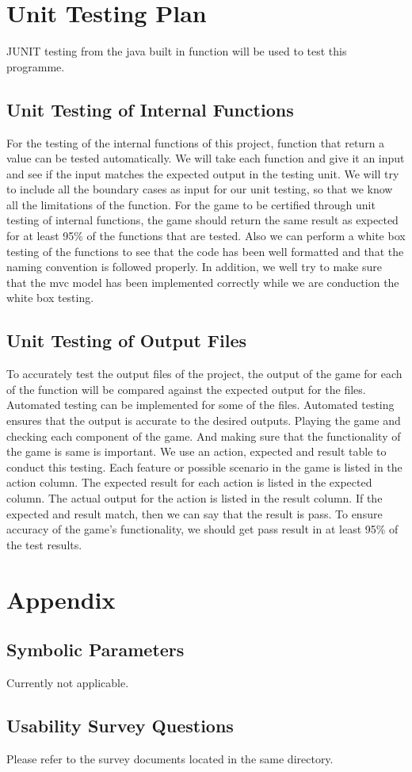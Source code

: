 \documentclass[12pt,letterpaper]{article}
\begin{document}
	\section{Unit Testing Plan}
	JUNIT testing from the java built in function will be used to test this programme.
	\subsection{Unit Testing of Internal Functions}
	 For the testing of the internal functions of this project, function that return a value can be tested automatically. We will take each function and give it an input and see if the input matches the expected output in the testing unit. We will try to include all the boundary cases as input for our unit testing, so that we know all the limitations of the function. For the game to be certified through unit testing of internal functions, the game should return the same result as expected for at least 95\% of the functions that are tested. Also we can perform a white box testing of the functions to see that the code has been well formatted and that the naming convention is followed properly. In addition, we well try to make sure that the mvc model has been implemented correctly while we are conduction the white box testing.
	\subsection{Unit Testing of Output Files}
	To accurately test the output files of the project, the output of the game for each of the function will be compared against the expected output for the files. Automated testing can be implemented for some of the files. Automated testing ensures that the output is accurate to the desired outputs. Playing the game and checking each component of the game. And making sure that the functionality of the game is same is important. We use an action, expected and result table to conduct this testing. Each feature or possible scenario in the game is listed in the action column. The expected result for each action is listed in the expected column. The actual output for the action is listed in the result column. If the expected and result match, then we can say that the result is pass. To ensure accuracy of the game’s functionality, we should get pass result in at least 95\% of the test results.

	\section{Appendix}
	\subsection{Symbolic Parameters}
Currently not applicable.\\

	\subsection{Usability Survey Questions}
Please refer to the survey documents located in the same directory.\\
\end{document}
